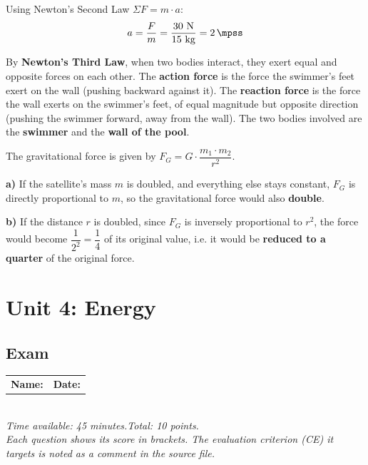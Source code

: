 \documentclass[11pt,a4paper]{article}
\newcommand{\examheader}[1]{%
\begin{center}
\begin{tabular}{ll}
\textbf{Name:} \makebox[6cm]{\dotfill} & \textbf{Date:} \makebox[3cm]{\dotfill} \\
\end{tabular}\\[4pt]
\textit{Time available: 45 minutes.\quad Total: 10 points.}\\[2pt]
\textit{Each question shows its score in brackets. The evaluation criterion (CE) it targets is noted as a comment in the source file.}
\end{center}
}
\begin{document}
\begin{solucioneng}
Using Newton's Second Law $\Sigma F = m \cdot a$:
\[
a = \dfrac{F}{m} = \dfrac{30\ \unit{\newton}}{15\ \unit{\kg}} = \qty{2}{\mpss}
\]
\end{solucioneng}

\begin{solucioneng}
By \textbf{Newton's Third Law}, when two bodies interact, they exert equal and opposite forces on each other. The \textbf{action force} is the force the swimmer's feet exert on the wall (pushing backward against it). The \textbf{reaction force} is the force the wall exerts on the swimmer's feet, of equal magnitude but opposite direction (pushing the swimmer forward, away from the wall). The two bodies involved are the \textbf{swimmer} and the \textbf{wall of the pool}.
\end{solucioneng}

\begin{solucioneng}
The gravitational force is given by $F_G = G \cdot \dfrac{m_1 \cdot m_2}{r^2}$.

\textbf{a)} If the satellite's mass $m$ is doubled, and everything else stays constant, $F_G$ is directly proportional to $m$, so the gravitational force would also \textbf{double}.

\textbf{b)} If the distance $r$ is doubled, since $F_G$ is inversely proportional to $r^2$, the force would become $\dfrac{1}{2^2} = \dfrac{1}{4}$ of its original value, i.e. it would be \textbf{reduced to a quarter} of the original force.
\end{solucioneng}

\newpage
\section{Unit 4: Energy}
\subsection*{Exam}
\examheader{Unit 4}
\setcounter{preg}{1}


\end{document}
